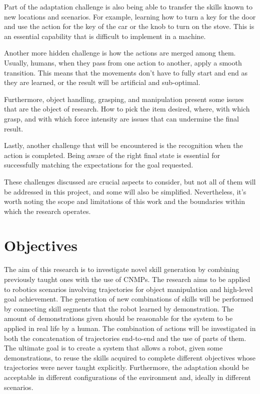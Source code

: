 Part of the adaptation challenge is also being able to transfer the skills known to new locations and scenarios. For example, learning how to turn a key for the door and use the action for the key of the car or the knob to turn on the stove. This is an essential capability that is difficult to implement in a machine.   

Another more hidden challenge is how the actions are merged among them. Usually, humans, when they pass from one action to another, apply a smooth transition. This means that the movements don't have to fully start and end as they are learned, or the result will be artificial and sub-optimal.   

Furthermore, object handling, grasping, and manipulation present some issues that are the object of research. How to pick the item desired, where,  with which grasp, and with which force intensity are issues that can undermine the final result.

Lastly, another challenge that will be encountered is the recognition when the action is completed. Being aware of the right final state is essential for successfully matching the expectations for the goal requested. 

These challenges discussed are crucial aspects to consider, but not all of them will be addressed in this project, and some will also be simplified. Nevertheless, it's worth noting the scope and limitations of this work and the boundaries within which the research operates.

\section{Objectives}
The aim of this research is to investigate novel skill generation by combining previously taught ones with the use of CNMPs. 
The research aims to be applied to robotics scenarios involving trajectories for object manipulation and high-level goal achievement. 
The generation of new combinations of skills will be performed by connecting skill segments that the robot learned by demonstration. The amount of demonstrations given should be reasonable for the system to be applied in real life by a human. 
The combination of actions will be investigated in both the concatenation of trajectories end-to-end and the use of parts of them. 
The ultimate goal is to create a system that allows a robot, given some demonstrations, to reuse the skills acquired to complete different objectives whose trajectories were never taught explicitly. Furthermore, the adaptation should be acceptable in different configurations of the environment and, ideally in different scenarios.


